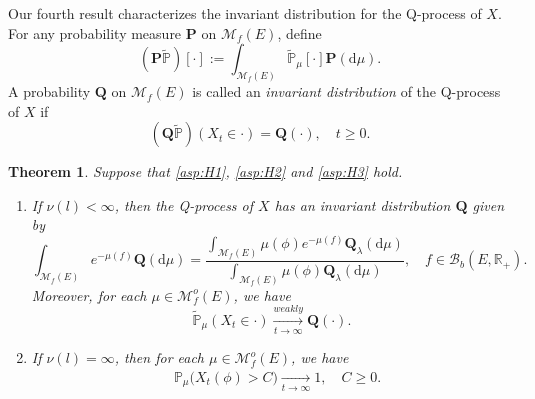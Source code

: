 \documentclass[12pt,a4paper]{amsart}
\numberwithin{equation}{section}
\theoremstyle{plain}
\newtheorem{thm}{Theorem}[section]
\theoremstyle{definition}
\theoremstyle{remark}
\begin{document}
	Our fourth result characterizes the invariant distribution for the Q-process of $X$. %
	For any probability measure $\mathbf P$ on $\mathcal M_f(E)$, define 
\[
	(\mathbf P\widetilde{\mathbb P})[\cdot] 
	:= \int_{\mathcal M_f(E)}\widetilde{\mathbb P}_\mu[\cdot] \mathbf P(\mathrm d\mu).
\]
	A probability $\mathbf Q$ on $\mathcal M_f(E)$ is called an \emph{invariant distribution} of the Q-process of $X$ if 
\[
	(\mathbf Q\widetilde{\mathbb P})(X_t \in \cdot ) 
	=\mathbf Q(\cdot),	\quad t\geq 0.
\]

\begin{thm}\label{thm:I}
	Suppose that \eqref{asp:H1}, \eqref{asp:H2} and \eqref{asp:H3} hold. 
\begin{enumerate}
\item
	If $\nu(l)<\infty$, then the Q-process of $X$ has an invariant distribution $\mathbf Q$ given by
\[
	\int_{{\mathcal M}_f(E)} e^{-\mu(f)}\mathbf Q(\mathrm d\mu)
	=\frac{\int_{{\mathcal M}_f(E)}\mu(\phi)e^{-\mu(f)}\mathbf Q_\lambda({\mathrm d}\mu)} {\int_{{\mathcal M}_f(E)}\mu(\phi)\mathbf Q_\lambda({\mathrm d}\mu)}, \quad f\in \mathcal B_b(E, \mathbb R_+).
\]	
Moreover, for each $\mu\in\mathcal M^o_f(E)$, we have
\[
	\widetilde{\mathbb P}_\mu(X_t \in \cdot ) \xrightarrow[t\to \infty]{weakly} {\mathbf Q}(\cdot).
\]
\item
	If $\nu(l) = \infty$, then for each $\mu \in \mathcal M^o_f(E)$, we have 
\begin{align} 
& \mathbb P_\mu\big(X_t(\phi) > C\big) \xrightarrow[t\to \infty]{} 1, \quad C\geq 0.
\end{align}
\end{enumerate}
\end{thm}
\end{document}
